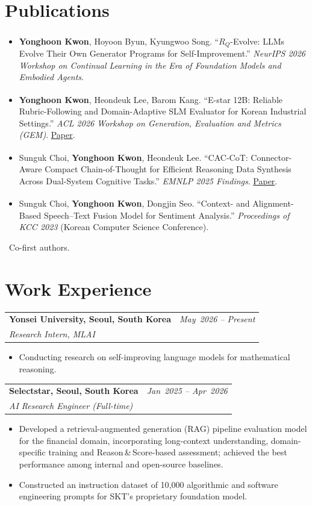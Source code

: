 \documentclass[10pt,a4paper]{article}
\makeatletter
\newcommand{\sectionheading}[1]{\section*{#1}}
\newcommand{\cventry}[4]{%
  \begin{tabularx}{\textwidth}{@{}X r@{}}%
    \textbf{#1} & \textit{#2}\\%
    \textit{#3} & \\
  \end{tabularx}%
  \vspace{2pt}%
  #4%
}
\makeatother
\begin{document}
\sectionheading{Publications}
\begin{itemize}
    \item \textbf{Yonghoon Kwon}\textsuperscript{\textdagger}, Hoyoon Byun\textsuperscript{\textdagger}, Kyungwoo Song. ``$R_Q$-Evolve: LLMs Evolve Their Own Generator Programs for Self-Improvement.'' \emph{NeurIPS 2026 Workshop on Continual Learning in the Era of Foundation Models and Embodied Agents}.
    \item \textbf{Yonghoon Kwon}\textsuperscript{\textdagger}, Heondeuk Lee\textsuperscript{\textdagger}, Barom Kang. ``E-star 12B: Reliable Rubric-Following and Domain-Adaptive SLM Evaluator for Korean Industrial Settings.'' \emph{ACL 2026 Workshop on Generation, Evaluation and Metrics (GEM)}. \href{https://aclanthology.org/2026.gem-main.42/}{Paper}.
    \item Sunguk Choi\textsuperscript{\textdagger}, \textbf{Yonghoon Kwon}\textsuperscript{\textdagger}, Heondeuk Lee\textsuperscript{\textdagger}. ``CAC-CoT: Connector-Aware Compact Chain-of-Thought for Efficient Reasoning Data Synthesis Across Dual-System Cognitive Tasks.'' \emph{EMNLP 2025 Findings}. \href{https://arxiv.org/abs/2508.18743}{Paper}.
    \item Sunguk Choi\textsuperscript{\textdagger}, \textbf{Yonghoon Kwon}\textsuperscript{\textdagger}, Dongjin Seo. ``Context- and Alignment-Based Speech--Text Fusion Model for Sentiment Analysis.'' \emph{Proceedings of KCC 2023} (Korean Computer Science Conference).
\end{itemize}
{\small\textdagger\ Co-first authors.\par}

\sectionheading{Work Experience}
\cventry{Yonsei University, Seoul, South Korea}{May~2026 -- Present}{Research Intern, MLAI}{%
\begin{itemize}
    \item Conducting research on self-improving language models for mathematical reasoning.
\end{itemize}}

\cventry{Selectstar, Seoul, South Korea}{Jan~2025 -- Apr~2026}{AI Research Engineer (Full-time)}{%
\begin{itemize}
    \item Developed a retrieval-augmented generation (RAG) pipeline evaluation model for the financial domain, incorporating long-context understanding, domain-specific training and Reason\,\&\,Score-based assessment; achieved the best performance among internal and open-source baselines.
    \item Constructed an instruction dataset of 10{,}000 algorithmic and software engineering prompts for SKT's proprietary foundation model.
\end{itemize}}
\end{document}

